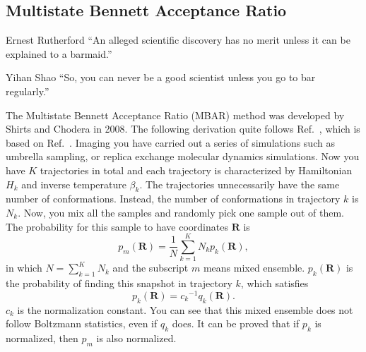 \subsection{Multistate Bennett Acceptance Ratio\label{Sec:FEM:MBAR}}
\begin{chapquote}{Ernest Rutherford%
	}
	``An alleged scientific discovery has no merit unless it can be explained to a barmaid.''
\end{chapquote}
\begin{chapquote}{Yihan Shao}
	``So, you can never be a good scientist unless you go to bar regularly.''
\end{chapquote}
The Multistate Bennett Acceptance Ratio (MBAR) method was developed by Shirts and Chodera in 2008.\cite{ShirtsJCP2008} The following derivation quite follows Ref.~\cite{ShirtsarXiv2017}, which is based on Ref.~\cite{GeyerTR1994}.
Imaging you have carried out a series of simulations such as umbrella sampling, or replica exchange molecular dynamics simulations.
Now you have $K$ trajectories in total and each trajectory is characterized by Hamiltonian $H_k$ and inverse temperature $\beta_k$. The trajectories unnecessarily have the same number of conformations. Instead, the number of conformations in trajectory $k$ is $N_k$. Now, you mix all the samples and randomly pick one sample out of them. The probability for this sample to have coordinates $\mathbf{R}$ is 
\begin{equation}
p_m(\mathbf{R})=\frac 1N\sum_{k=1}^{K}N_kp_k(\mathbf{R}),
\end{equation}
in which $N=\sum\limits_{k=1}^{K}N_k$ and the subscript $m$ means mixed ensemble. $p_k(\mathbf{R})$ is the probability of finding this snapshot in trajectory $k$, which satisfies
\begin{equation}
p_k(\mathbf{R})={c_k}^{-1}q_k(\mathbf{R}).
\end{equation}
$c_k$ is the normalization constant. You can see that this mixed ensemble does not follow Boltzmann statistics, even if $q_k$ does. It can be proved that if $p_k$ is normalized, then $p_m$ is also normalized.

